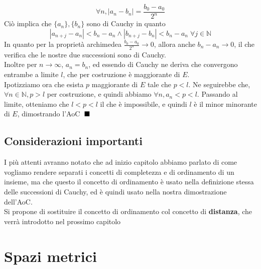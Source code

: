 \documentclass{article}
\newcommand{\qed}{\rule{0.7em}{0.7em}}
\begin{document}
            $$\forall n, |a_n - b_n| = \frac{b_0 - a_0}{2^n}$$
            Ciò implica che $\{a_n\},\{b_n\}$ sono di Cauchy in quanto 
            $$|a_{n+j} - a_n| < b_n - a_n \land |b_{n+j} - b_n| < b_n - a_n \; \forall j \in \mathbb{N}$$
            In quanto per la proprietà archimedea $\frac{b_0 - a_0}{2^n} \to 0$, allora anche $b_n - a_n \to 0$, il che 
            verifica che le nostre due successioni sono di Cauchy. \\
            Inoltre per $n \to \infty$, $a_n = b_n$, ed essendo di Cauchy ne deriva che convergono entrambe a limite $l$, che 
            per costruzione è maggiorante di $E$. \\
            Ipotizziamo ora che esista $p$ maggiorante di 
            $E$ tale che $p < l$. Ne seguirebbe che, $\forall n \in \mathbb{N}, p > l$ per costruzione, e quindi 
            abbiamo $\forall n, a_n < p < l$. Passando al limite, otteniamo che $l < p < l$ il che è impossibile, 
            e quindi $l$ è il minor minorante di $E$, dimostrando l'AoC $\; \qed$
        \subsection{Considerazioni importanti}
            I più attenti avranno notato che ad inizio capitolo abbiamo parlato di come vogliamo 
            rendere separati i concetti di completezza e di ordinamento di un insieme, ma che 
            questo il concetto di ordinamento è usato nella definizione stessa delle successioni di 
            Cauchy, ed è quindi usato nella nostra dimostrazione dell'AoC. \\
            Si propone di sostituire il concetto di ordinamento col concetto di \textbf{distanza}, che 
            verrà introdotto nel prossimo capitolo 
\newpage
\section{Spazi metrici}
\end{document}
